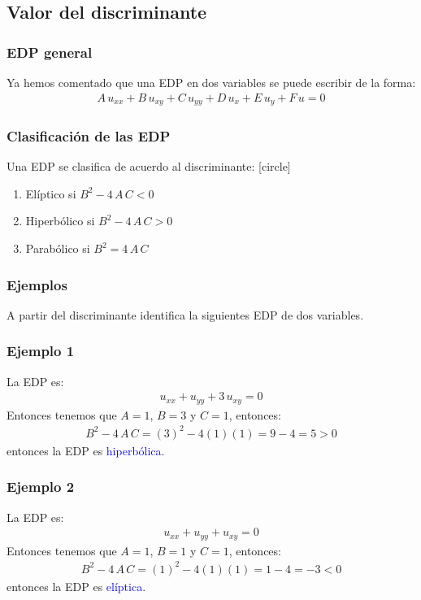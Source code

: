 \subsection{Valor del discriminante}
\begin{frame}
\frametitle{EDP general}
Ya hemos comentado que una EDP en dos variables se puede escribir de la forma:
\begin{align*}
A \, u_{xx} + B \, u_{xy} + C \, u_{yy} + D \, u_{x} + E \, u_{y} + F \, u = 0
\end{align*}
\end{frame}
\begin{frame}
\frametitle{Clasificación de las EDP}
Una EDP se clasifica de acuerdo al discriminante:
[circle]
\begin{enumerate}[<+->]
\item Elíptico si $B^{2} - 4 \, A \, C < 0$
\item Hiperbólico si $B^{2} - 4 \, A \, C > 0$
\item Parabólico si $B^{2} = 4 \, A \, C$
\end{enumerate}
\end{frame}
\begin{frame}
\frametitle{Ejemplos}
A partir del discriminante identifica la siguientes EDP de dos variables.
\end{frame}
\begin{frame}
\frametitle{Ejemplo 1}
La EDP es:
\begin{align*}
u_{xx} + u_{yy} + 3 \, u_{xy} = 0
\end{align*}
\pause
Entonces tenemos que $A = 1$, $B = 3$ y $C = 1$, entonces:
\begin{align*}
B^{2} - 4 \, A \, C = (3)^{2} - 4 (1)(1) = 9 - 4 = 5 > 0
\end{align*}
\pause
entonces la EDP es \textcolor{blue}{hiperbólica}.
\end{frame}
\begin{frame}
\frametitle{Ejemplo 2}
La EDP es:
\begin{align*}
u_{xx} + u_{yy} + u_{xy} = 0
\end{align*}
\pause
Entonces tenemos que $A = 1$, $B = 1$ y $C = 1$, entonces:
\begin{align*}
B^{2} - 4 \, A \, C = (1)^{2} - 4 (1)(1) = 1 - 4 = -3 < 0
\end{align*}
\pause
entonces la EDP es \textcolor{blue}{elíptica}.
\end{frame}
